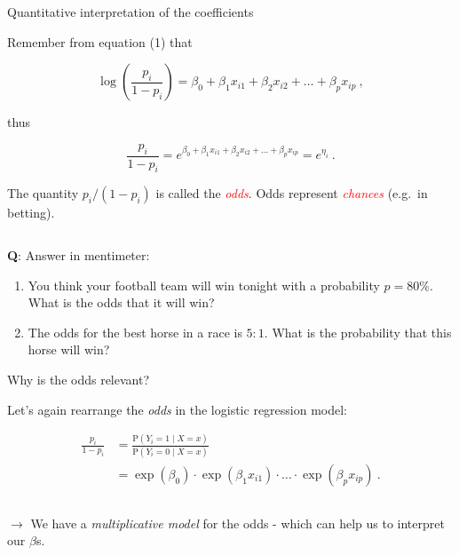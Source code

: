 \documentclass[10pt,ignorenonframetext,]{beamer}
\begin{document}
\begin{frame}

\begin{block}{Quantitative interpretation of the coefficients}

\vspace{2mm}

Remember from equation (1) that

\begin{equation*}
\log\left( \frac{p_i}{1-p_i} \right) = \beta_0 + \beta_1 x_{i1} + \beta_2 x_{i2} + \ldots + \beta_p x_{ip} \ ,
\end{equation*}

thus

\begin{equation*}
 \frac{p_i}{1-p_i} = e^{\beta_0 + \beta_1 x_{i1} + \beta_2 x_{i2} + \ldots + \beta_p x_{ip}} = e^{\eta_i} \ .
\end{equation*}

\vspace{2mm}

The quantity \(p_i/(1-p_i)\) is called the \emph{\textcolor{red}{odds}}.
Odds represent \emph{\textcolor{red}{chances}} (e.g.~in betting).

\(~\)

\textbf{Q}: Answer in mentimeter:

\begin{enumerate}
\item
  You think your football team will win tonight with a probability
  \(p=80\%\). What is the odds that it will win?
\item
  The odds for the best horse in a race is \(5:1\). What is the
  probability that this horse will win?
\end{enumerate}

\end{block}

\end{frame}

\begin{frame}

\begin{block}{Why is the odds relevant?}

\vspace{2mm}

Let's again rearrange the \emph{odds} in the logistic regression model:

\begin{align*}
 \frac{p_i}{1-p_i} &=  \frac{\text{P}(Y_i=1 \mid X=x)}{\text{P}(Y_i=0 \mid X = x)} \\[2mm]
 &= \exp(\beta_0) \cdot \exp(\beta_1 x_{i1}) \cdot \ldots \cdot  \exp(\beta_p x_{ip}) \ .
 \end{align*}

\(~\)

\(\rightarrow\) We have a \emph{multiplicative model} for the odds -
which can help us to interpret our \(\beta\)s.

\end{block}

\end{frame}
\end{document}
